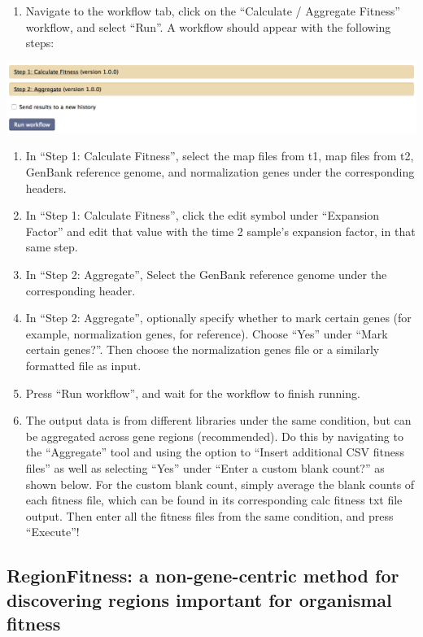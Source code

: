 \documentclass[11pt,]{article}
\providecommand{\tightlist}{%
  \setlength{\itemsep}{0pt}\setlength{\parskip}{0pt}}
\begin{document}
\begin{enumerate}
\def\labelenumi{\arabic{enumi}.}
\tightlist
\item
  Navigate to the workflow tab, click on the ``Calculate / Aggregate
  Fitness'' workflow, and select ``Run''. A workflow should appear with
  the following steps:
\end{enumerate}

\centerline{\includegraphics[width=0.8\linewidth]{figs/CalcAgg.png}}

\begin{enumerate}
\def\labelenumi{\arabic{enumi}.}
\setcounter{enumi}{1}
\tightlist
\item
  In ``Step 1: Calculate Fitness'', select the map files from t1, map
  files from t2, GenBank reference genome, and normalization genes under
  the corresponding headers.
\item
  In ``Step 1: Calculate Fitness'', click the edit symbol under
  ``Expansion Factor'' and edit that value with the time 2 sample's
  expansion factor, in that same step.
\item
  In ``Step 2: Aggregate'', Select the GenBank reference genome under
  the corresponding header.
\item
  In ``Step 2: Aggregate'', optionally specify whether to mark certain
  genes (for example, normalization genes, for reference). Choose
  ``Yes'' under ``Mark certain genes?''. Then choose the normalization
  genes file or a similarly formatted file as input.
\item
  Press ``Run workflow'', and wait for the workflow to finish running.
\item
  The output data is from different libraries under the same condition,
  but can be aggregated across gene regions (recommended). Do this by
  navigating to the ``Aggregate'' tool and using the option to ``Insert
  additional CSV fitness files'' as well as selecting ``Yes'' under
  ``Enter a custom blank count?'' as shown below. For the custom blank
  count, simply average the blank counts of each fitness file, which can
  be found in its corresponding calc fitness txt file output. Then enter
  all the fitness files from the same condition, and press ``Execute''!
\end{enumerate}

\subsection{RegionFitness: a non-gene-centric method for discovering
regions important for organismal
fitness}\label{regionfitness-a-non-gene-centric-method-for-discovering-regions-important-for-organismal-fitness}
\end{document}

